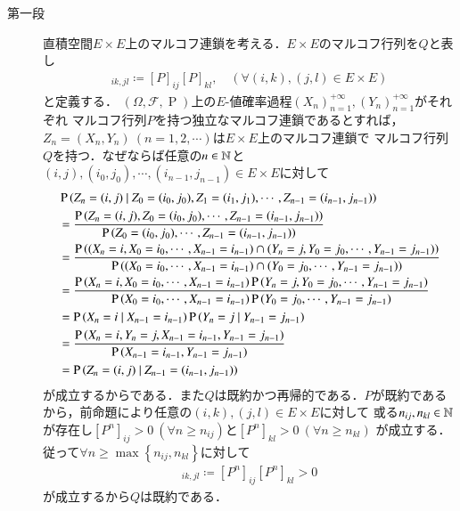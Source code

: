 	\begin{prf}\mbox{}
	\begin{description}
	\item[第一段]
		直積空間$E \times E$上のマルコフ連鎖を考える．$E \times E$のマルコフ行列を$Q$と表し
		\begin{align}
			[Q]_{ik,jl} \coloneqq [P]_{ij}[P]_{kl}, \quad (\forall (i,k), (j,l) \in E \times E)
		\end{align}
		と定義する．
		$(\Omega,\mathcal{F},\operatorname{P})$上の$E$-値確率過程$(X_n)_{n=1}^{+\infty}, (Y_n)_{n=1}^{+\infty}$がそれぞれ
		マルコフ行列$P$を持つ独立なマルコフ連鎖であるとすれば，$Z_n=(X_n,Y_n)\ (n=1,2,\cdots)$は$E \times E$上のマルコフ連鎖で
		マルコフ行列$Q$を持つ．なぜならば任意の$n \in \mathbb{N}$と$(i,j),(i_0,j_0),\cdots,(i_{n-1},j_{n-1}) \in E \times E$に対して
		\begin{align}
			&\operatorname{P} \left( Z_n = (i,j) \ \middle|\ Z_0=(i_0,j_0),Z_1=(i_1,j_1), \cdots, Z_{n-1} = (i_{n-1},j_{n-1}) \right) \\
			&= \frac{\operatorname{P} \left(Z_n = (i,j), Z_0=(i_0,j_0),\cdots, Z_{n-1} = (i_{n-1},j_{n-1})\right)}{\operatorname{P} \left(Z_0=(i_0,j_0),\cdots, Z_{n-1} = (i_{n-1},j_{n-1})\right)} \\
			&= \frac{\operatorname{P} \left((X_n=i,X_0=i_0,\cdots, X_{n-1} = i_{n-1})\cap(Y_n=j,Y_0=j_0,\cdots, Y_{n-1}=j_{n-1})\right)}{\operatorname{P} \left((X_0=i_0,\cdots, X_{n-1} = i_{n-1})\cap(Y_0=j_0,\cdots, Y_{n-1}=j_{n-1})\right)} \\
			&= \frac{\operatorname{P} \left(X_n=i,X_0=i_0,\cdots, X_{n-1} = i_{n-1}\right)\operatorname{P} \left(Y_n=j,Y_0=j_0,\cdots, Y_{n-1}=j_{n-1}\right)}{\operatorname{P} \left(X_0=i_0,\cdots, X_{n-1}=i_{n-1}\right)\operatorname{P} \left(Y_0=j_0,\cdots, Y_{n-1}=j_{n-1}\right)} \\
			&= \operatorname{P} \left( X_n = i \ \middle|\ X_{n-1}=i_{n-1} \right)\operatorname{P} \left( Y_n = j \ \middle|\ Y_{n-1}=j_{n-1} \right) \label{eq:ergodic_discrete_1}\\
			&= \frac{\operatorname{P} \left(X_n=i,Y_n=j,X_{n-1}=i_{n-1},Y_{n-1}=j_{n-1}\right)}{\operatorname{P} \left(X_{n-1}=i_{n-1},Y_{n-1}=j_{n-1}\right)} \\
			&= \operatorname{P} \left( Z_n=(i,j) \ \middle|\ Z_{n-1}=(i_{n-1},j_{n-1}) \right)
		\end{align}
		が成立するからである．また$Q$は既約かつ再帰的である．$P$が既約であるから，前命題により任意の$(i,k),(j,l) \in E \times E$に対して
		或る$n_{ij},n_{kl} \in \mathbb{N}$が存在し$[P^n]_{ij} > 0\ (\forall n \geq n_{ij})$と$[P^n]_{kl} > 0\ (\forall n \geq n_{kl})$
		が成立する．従って$\forall n \geq \max{}{\left\{n_{ij},n_{kl}\right\}}$に対して
		\begin{align}
			[Q^n]_{ik,jl} \coloneqq [P^n]_{ij}[P^n]_{kl} > 0
		\end{align}
		が成立するから$Q$は既約である．
		\begin{rem}

\end{rem}
\end{description}
\end{prf}
